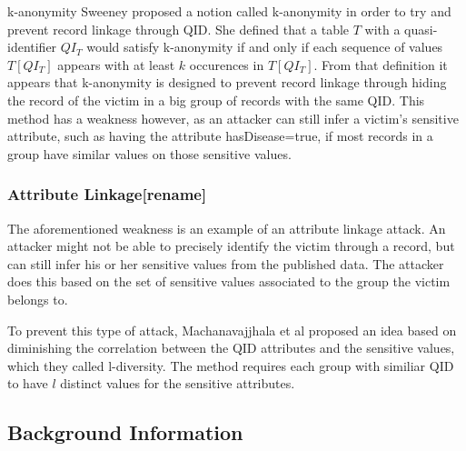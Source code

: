 k-anonymity  
Sweeney\cite{sweeney2002k} proposed a notion called k-anonymity in order to try and prevent record linkage through QID. She defined that a table $T$ with a quasi-identifier $QI_T$ would satisfy k-anonymity if and only if each sequence of values $T[QI_T]$ appears with at least $k$ occurences in $T[QI_T]$. From that definition it appears that k-anonymity is designed to prevent record linkage through hiding the record of the victim in a big group of records with the same QID. This method has a weakness however, as an attacker can still infer a victim's sensitive attribute, such as having the attribute hasDisease=true, if most records in a group have similar values on those sensitive values. 

\subsubsection{Attribute Linkage[rename]}
The aforementioned weakness is an example of an attribute linkage attack. An attacker might not be able to precisely identify the victim through a record, but can still infer his or her sensitive values from the published data. The attacker does this based on the set of sensitive values associated to the group the victim belongs to. 

To prevent this type of attack, Machanavajjhala et al\cite{machanavajjhala2007diversity} proposed an idea based on diminishing the correlation between the QID attributes and the sensitive values, which they called l-diversity. The method requires each group with similiar QID to have $l$ distinct values for the sensitive attributes. 


\subsection{Background Information}	

\cleardoublepage